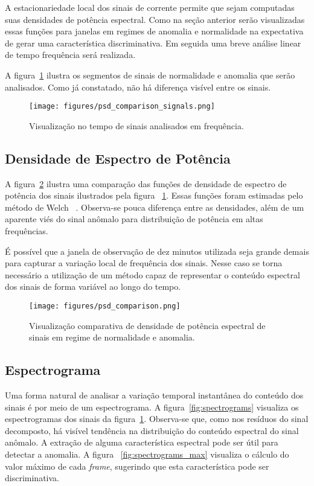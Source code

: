 A estacionariedade local dos sinais de corrente permite que sejam computadas
suas densidades de potência espectral. Como na seção anterior serão
visualizadas essas funções para janelas em regimes de anomalia e normalidade na
expectativa de gerar uma característica discriminativa. Em seguida uma breve
análise linear de tempo frequência será realizada.

A figura~\ref{fig:psd_signals} ilustra os segmentos de sinais de normalidade e
anomalia que serão analisados. Como já constatado, não há diferença visível
entre os sinais.

\begin{figure}[H]
    \centering
    \texttt{[image: figures/psd\_comparison\_signals.png]}
    \caption{Visualização no tempo de sinais analisados em frequência.}
    \label{fig:psd_signals}
\end{figure}

\subsection{Densidade de Espectro de Potência}

A figura~\ref{fig:psd_comparison} ilustra uma comparação das funções de
densidade de espectro de potência dos sinais ilustrados pela figura
~\ref{fig:psd_signals}. Essas funções foram estimadas pelo método de Welch
~\cite{welch}. Observa-se pouca diferença entre as densidades, além de um
aparente viés do sinal anômalo para distribuição de potência em altas
frequências.

É possível que a janela de observação de dez minutos utilizada seja grande
demais para capturar a variação local de frequência dos sinais. Nesse caso
se torna necessário a utilização de um método capaz de representar o conteúdo
espectral dos sinais de forma variável ao longo do tempo.

\begin{figure}[H]
    \centering
    \texttt{[image: figures/psd\_comparison.png]}
    \caption{Visualização comparativa de densidade de potência espectral de
    sinais em regime de normalidade e anomalia.}
    \label{fig:psd_comparison}
\end{figure}

\subsection{Espectrograma}

Uma forma natural de analisar a variação temporal instantânea do conteúdo dos
sinais é por meio de um espectrograma. A figura~\ref{fig:spectrograms}
visualiza os espectrogramas dos sinais da figura~\ref{fig:psd_signals}.
Observa-se que, como nos resíduos do sinal decomposto, há visível tendência na
distribuição do conteúdo espectral do sinal anômalo. A extração de alguma
característica espectral pode ser útil para detectar a anomalia. A figura
~\ref{fig:spectrograms_max} visualiza o cálculo do valor máximo de cada
\emph{frame}, sugerindo que esta característica pode ser discriminativa.

